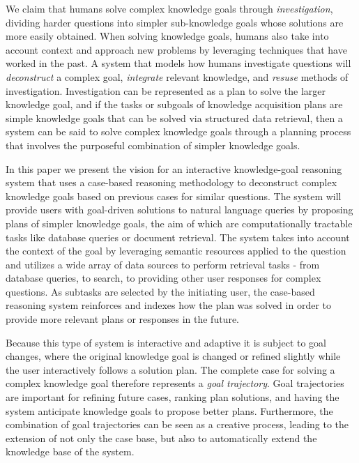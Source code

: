 \documentclass[11pt,letterpaper]{article}
\begin{document}
We claim that humans solve complex knowledge goals through \textit{investigation}, dividing harder questions into simpler sub-knowledge goals whose solutions are more easily obtained. When solving knowledge goals, humans also take into account context and approach new problems by leveraging techniques that have worked in the past. A system that models how humans investigate questions will \textit{deconstruct} a complex goal, \textit{integrate} relevant knowledge, and \textit{resuse} methods of investigation. Investigation can be represented as a plan to solve the larger knowledge goal, and if the tasks or subgoals of knowledge acquisition plans are simple knowledge goals that can be solved via structured data retrieval, then a system can be said to solve complex knowledge goals through a planning process that involves the purposeful combination of simpler knowledge goals.

In this paper we present the vision for an interactive knowledge-goal reasoning system that uses a case-based reasoning methodology to deconstruct complex knowledge goals based on previous cases for similar questions. The system will provide users with goal-driven solutions to natural language queries by proposing plans of simpler knowledge goals, the aim of which are computationally tractable tasks like database queries or document retrieval. The system takes into account the context of the goal by leveraging semantic resources applied to the question and utilizes a wide array of data sources to perform retrieval tasks - from database queries, to search, to providing other user responses for complex questions. As subtasks are selected by the initiating user, the case-based reasoning system reinforces and indexes how the plan was solved in order to provide more relevant plans or responses in the future.

Because this type of system is interactive and adaptive it is subject to goal changes, where the original knowledge goal is changed or refined slightly while the user interactively follows a solution plan. The complete case for solving a complex knowledge goal therefore represents a \textit{goal trajectory}. Goal trajectories are important for refining future cases, ranking plan solutions, and having the system anticipate knowledge goals to propose better plans. Furthermore, the combination of goal trajectories can be seen as a creative process, leading to the extension of not only the case base, but also to automatically extend the knowledge base of the system.

\end{document}
